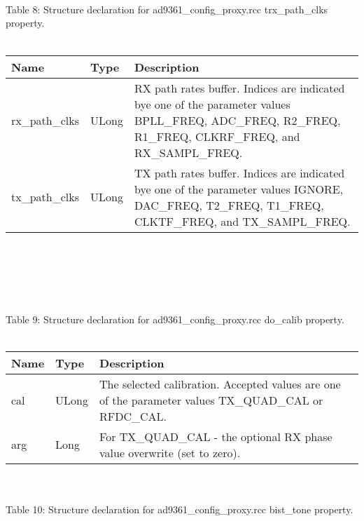 \documentclass{article}
\def\comp{ad9361\_config\_proxy}
\begin{document}
\begin{landscape}
\begin{scriptsize}
	\end{scriptsize}\\ \\ \\
	Table \hypertarget{tab8}{8}: Structure declaration for \comp{}.rcc trx\_path\_clks property.\\ \\
		\begin{scriptsize}			
		\begin{tabular}{|p{4.7cm}|p{2.7cm}|p{13.77cm}|} \hline \cellcolor{blue} Name & \cellcolor{blue}Type & \cellcolor{blue}Description \\ \hline rx\_path\_clks & ULong & RX path rates buffer. Indices are indicated bye one of the parameter values BPLL\_FREQ, ADC\_FREQ, R2\_FREQ, R1\_FREQ, CLKRF\_FREQ, and RX\_SAMPL\_FREQ.\\ \hline tx\_path\_clks & ULong & TX path rates buffer. Indices are indicated bye one of the parameter values IGNORE,    DAC\_FREQ, T2\_FREQ, T1\_FREQ, CLKTF\_FREQ, and TX\_SAMPL\_FREQ.\\ \hline \end{tabular}
	\end{scriptsize}\\ \\ \\ \\ \\
	Table \hypertarget{tab9}{9}: Structure declaration for \comp{}.rcc do\_calib property.\\ \\
		\begin{scriptsize}
		\begin{tabular}{|p{4.7cm}|p{2.7cm}|p{13.77cm}|} \hline \cellcolor{blue} Name & \cellcolor{blue}Type & \cellcolor{blue}Description \\ \hline cal & ULong & The selected calibration. Accepted values are one of the parameter values TX\_QUAD\_CAL or RFDC\_CAL. \\ \hline arg & Long & For TX\_QUAD\_CAL - the optional RX phase value overwrite (set to zero).\\ \hline \end{tabular}
	\end{scriptsize}\\ \\
	Table \hypertarget{tab10}{10}: Structure declaration for \comp{}.rcc bist\_tone property.\\ \\
		\begin{scriptsize}

\end{scriptsize}
\end{landscape}
\end{document}
